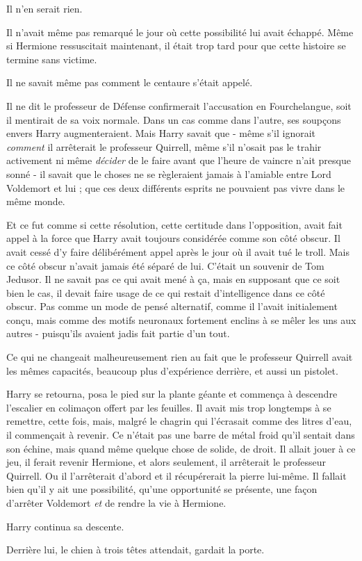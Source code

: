 Il n'en serait rien.

Il n'avait même pas remarqué le jour où cette possibilité lui avait échappé. Même si Hermione ressuscitait maintenant, il était trop tard pour que cette histoire se termine sans victime.

Il ne savait même pas comment le centaure s'était appelé.

Il ne dit le professeur de Défense confirmerait l'accusation en Fourchelangue, soit il mentirait de sa voix normale. Dans un cas comme dans l'autre, ses soupçons envers Harry augmenteraient. Mais Harry savait que - même s'il ignorait \emph{comment}  il arrêterait le professeur Quirrell, même s'il n'osait pas le trahir activement ni même \emph{décider}  de le faire avant que l'heure de vaincre n'ait presque sonné - il savait que le choses ne se règleraient jamais à l'amiable entre Lord Voldemort et lui ; que ces deux différents esprits ne pouvaient pas vivre dans le même monde.

Et ce fut comme si cette résolution, cette certitude dans l'opposition, avait fait appel à la force que Harry avait toujours considérée comme son côté obscur. Il avait cessé d'y faire délibérément appel après le jour où il avait tué le troll. Mais ce côté obscur n'avait jamais été séparé de lui. C'était un souvenir de Tom Jedusor. Il ne savait pas ce qui avait mené à ça, mais en supposant que ce soit bien le cas, il devait faire usage de ce qui restait d'intelligence dans ce côté obscur. Pas comme un mode de pensé alternatif, comme il l'avait initialement conçu, mais comme des motifs neuronaux fortement enclins à se mêler les uns aux autres - puisqu'ils avaient jadis fait partie d'un tout.

Ce qui ne changeait malheureusement rien au fait que le professeur Quirrell avait les mêmes capacités, beaucoup plus d'expérience derrière, et aussi un pistolet.

Harry se retourna, posa le pied sur la plante géante et commença à descendre l'escalier en colimaçon offert par les feuilles. Il avait mis trop longtemps à se remettre, cette fois, mais, malgré le chagrin qui l'écrasait comme des litres d'eau, il commençait à revenir. Ce n'était pas une barre de métal froid qu'il sentait dans son échine, mais quand même quelque chose de solide, de droit. Il allait jouer à ce jeu, il ferait revenir Hermione, et alors seulement, il arrêterait le professeur Quirrell. Ou il l'arrêterait d'abord et il récupérerait la pierre lui-même. Il fallait bien qu'il y ait une possibilité, qu'une opportunité se présente, une façon d'arrêter Voldemort \emph{et}  de rendre la vie à Hermione.

Harry continua sa descente.

Derrière lui, le chien à trois têtes attendait, gardait la porte.

